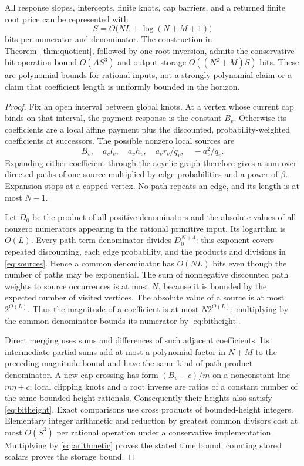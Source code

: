 \begin{theorem}\label{thm:bit}
All response slopes, intercepts, finite knots, cap barriers, and a returned finite root price can be represented with
\begin{equation}\label{eq:bitheight}
 S=O\bigl(NL+\log(N+M+1)\bigr)
\end{equation}
bits per numerator and denominator. The construction in Theorem~\ref{thm:quotient}, followed by one root inversion, admits the conservative bit-operation bound $O(AS^3)$ and output storage $O((N^2+M)S)$ bits. These are polynomial bounds for rational inputs, not a strongly polynomial claim or a claim that coefficient length is uniformly bounded in the horizon.
\end{theorem}
\begin{proof}
Fix an open interval between global knots. At a vertex whose current cap binds on that interval, the payment response is the constant $B_v$. Otherwise its coefficients are a local affine payment plus the discounted, probability-weighted coefficients at successors. The possible nonzero local sources are
\begin{equation}\label{eq:sources}
 B_v,\quad a_vl_v,\quad a_vh_v,\quad a_vr_v/q_v,\quad -a_v^2/q_v.
\end{equation}
Expanding either coefficient through the acyclic graph therefore gives a sum over directed paths of one source multiplied by edge probabilities and a power of $\beta$. Expansion stops at a capped vertex. No path repeats an edge, and its length is at most $N-1$.

Let $D_0$ be the product of all positive denominators and the absolute values of all nonzero numerators appearing in the rational primitive input. Its logarithm is $O(L)$. Every path-term denominator divides $D_0^{N+4}$: this exponent covers repeated discounting, each edge probability, and the products and divisions in \eqref{eq:sources}. Hence a common denominator has $O(NL)$ bits even though the number of paths may be exponential. The sum of nonnegative discounted path weights to source occurrences is at most $N$, because it is bounded by the expected number of visited vertices. The absolute value of a source is at most $2^{O(L)}$. Thus the magnitude of a coefficient is at most $N2^{O(L)}$; multiplying by the common denominator bounds its numerator by \eqref{eq:bitheight}.

Direct merging uses sums and differences of such adjacent coefficients. Its intermediate partial sums add at most a polynomial factor in $N+M$ to the preceding magnitude bound and have the same kind of path-product denominator. A new cap crossing has form $(B_v-c)/m$ on a nonconstant line $m\eta+c$; local clipping knots and a root inverse are ratios of a constant number of the same bounded-height rationals. Consequently their heights also satisfy \eqref{eq:bitheight}. Exact comparisons use cross products of bounded-height integers. Elementary integer arithmetic and reduction by greatest common divisors cost at most $O(S^3)$ per rational operation under a conservative implementation. Multiplying by \eqref{eq:arithmetic} proves the stated time bound; counting stored scalars proves the storage bound.\end{proof}

